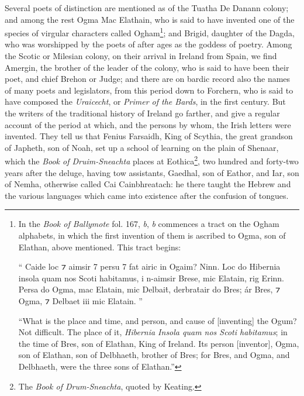\documentclass[11pt,oneside]{memoir}
\begin{document}
Several poets of distinction are mentioned as of the Tuatha De Danann colony; and among the rest Ogma Mac Elathain, who is said to have invented one of the species of virgular characters called Ogham\footnote{
    In the \textit{Book of Ballymote} fol. 167, \textit{b}, \textit{b} commences a tract on the Ogham alphabets, in which the first invention of them is ascribed to Ogma, son of Elathan, above mentioned. This tract begins:

    ``{\gaelicfont
        Caide loc ⁊ aimsir 7 persu 7 fat airic in Ogaim?
        Ninn.
        Loc do Hibernia insola quam nos Scoti habitamus, i n-aimsir Brese, mic Elatain, rig Erinn.
        Persa do Ogma, mac Elatain, mic Delbaiṫ, derbraṫair do Bres;
        ár Bres, ⁊ Ogma, ⁊ Delbaet iii mic Elatain.
    }''

    ``What is the place and time, and person, and cause of [inventing] the Ogum?
    Not difficult.
    The place of it, \textit{Hibernia Insola quam nos Scoti habitamus};
    in the time of Bres, son of Elathan, King of Ireland.
    Its person [inventor], Ogma, son of Elathan, son of Delbhaeth, brother of Bres;
    for Bres, and Ogma, and Delbhaeth, were the three sons of Elathan.''
};
and Brigid, daughter of the Dagda, who was worshipped by the poets of after ages as the goddess of poetry.
Among the Scotic or Milesian colony, on their arrival in Ireland from Spain, we find Amergin, the brother of the leader of the colony, who is said to have been their poet, and chief Brehon or Judge;
and there are on bardic record also the names of many poets and legislators, from this period down to Forchern, who is said to have composed the \textit{Uraicecht}, or \textit{Primer of the Bards}, in the first century.
But the writers of the traditional history of Ireland go farther, and give a regular account of the period at which, and the persons by whom, the Irish letters were invented.
They tell us that Fenius Farsaidh, King of Scythia, the great grandson of Japheth, son of Noah, set up a school of learning on the plain of Shenaar, which the \textit{Book of Druim-Sneachta} places at Eothica\footnote{
    The \textit{Book of Drum-Sneachta}, quoted by Keating. %
}, two hundred and forty-two years after the deluge, having tow assistants, Gaedhal, son of Eathor, and Iar, son of Nemha, otherwise called Cai Cainbhreatach:
he there taught the Hebrew and the various languages which came into existence after the confusion of tongues.
\end{document}
